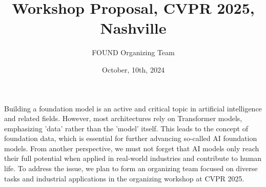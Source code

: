 \documentclass{article}
\title{Workshop Proposal, CVPR 2025, Nashville}
\author{FOUND Organizing Team}
\date{October, 10th, 2024}
\begin{document}
\maketitle


Building a foundation model is an active and critical topic in artificial intelligence and related fields. However, most architectures rely on Transformer models, emphasizing 'data' rather than the 'model' itself. This leads to the concept of foundation data, which is essential for further advancing so-called AI foundation models. From another perspective, we must not forget that AI models only reach their full potential when applied in real-world industries and contribute to human life. To address the issue, we plan to form an organizing team focused on diverse tasks and industrial applications in the organizing workshop at CVPR 2025.
\end{document}
